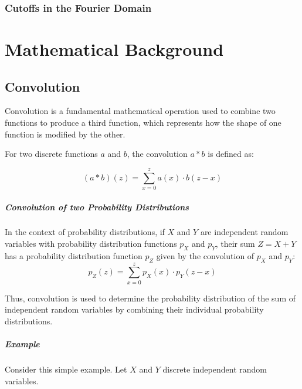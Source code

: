 \documentclass{masterthesis}
\begin{document}
\subsection*{Cutoffs in the Fourier Domain}

\appendix

\chapter*{Mathematical Background}

\section*{Convolution}

Convolution is a fundamental mathematical operation used to combine two functions to produce a third function, which represents how the shape of one function is modified by the other. 

For two discrete functions \(a\) and \(b\), the convolution \(a * b\) is defined as:

\begin{equation}
    (a * b)(z) = \sum_{x=0}^{z} a(x) \cdot b(z - x)
\end{equation}

\paragraph*{Convolution of two Probability Distributions}
In the context of probability distributions, if \(X\) and \(Y\) are independent random variables with probability distribution functions \(p_X\) and \(p_Y\), their sum \(Z = X + Y\) has a probability distribution function \(p_Z\) given by the convolution of \(p_X\) and \(p_Y\):
\begin{equation}\label{eq:convolution}
    p_Z(z) = \sum_{x=0}^{z} p_X(x) \cdot p_Y(z - x)
\end{equation}

Thus, convolution is used to determine the probability distribution of the sum of independent random variables by combining their individual probability distributions.

\paragraph*{Example} 

Consider this simple example. Let $X$ and $Y$ discrete independent random variables. 
\end{document}
